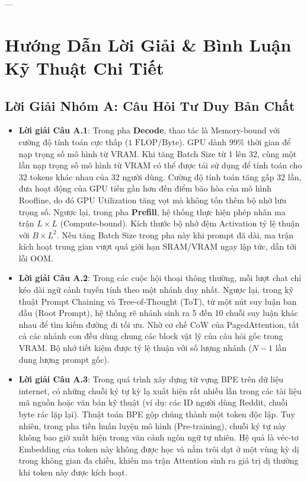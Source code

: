 ---

\section{Hướng Dẫn Lời Giải \& Bình Luận Kỹ Thuật Chi Tiết}
\label{sec:ch07-solutions}

\subsection{Lời Giải Nhóm A: Câu Hỏi Tư Duy Bản Chất}
\begin{itemize}
  \item \textbf{Lời giải Câu A.1}:
  Trong pha \textbf{Decode}, thao tác là Memory-bound với cường độ tính toán cực thấp ($1\text{ FLOP/Byte}$). GPU dành $99\%$ thời gian để nạp trọng số mô hình từ VRAM. Khi tăng Batch Size từ 1 lên 32, cùng một lần nạp trọng số mô hình từ VRAM có thể được tái sử dụng để tính toán cho 32 tokens khác nhau của 32 người dùng. Cường độ tính toán tăng gấp 32 lần, đưa hoạt động của GPU tiến gần hơn đến điểm bão hòa của mô hình Roofline, do đó GPU Utilization tăng vọt mà không tốn thêm bộ nhớ lưu trọng số.
  Ngược lại, trong pha \textbf{Prefill}, hệ thống thực hiện phép nhân ma trận $L \times L$ (Compute-bound). Kích thước bộ nhớ đệm Activation tỷ lệ thuận với $B \times L^2$. Nếu tăng Batch Size trong pha này khi prompt đã dài, ma trận kích hoạt trung gian vượt quá giới hạn SRAM/VRAM ngay lập tức, dẫn tới lỗi OOM.

  \item \textbf{Lời giải Câu A.2}:
  Trong các cuộc hội thoại thông thường, mỗi lượt chat chỉ kéo dài ngữ cảnh tuyến tính theo một nhánh duy nhất. Ngược lại, trong kỹ thuật Prompt Chaining và Tree-of-Thought (ToT), từ một nút suy luận ban đầu (Root Prompt), hệ thống rẽ nhánh sinh ra 5 đến 10 chuỗi suy luận khác nhau để tìm kiếm đường đi tối ưu. Nhờ cơ chế CoW của PagedAttention, tất cả các nhánh con đều dùng chung các block vật lý của câu hỏi gốc trong VRAM. Bộ nhớ tiết kiệm được tỷ lệ thuận với số lượng nhánh ($N-1$ lần dung lượng prompt gốc).

  \item \textbf{Lời giải Câu A.3}:
  Trong quá trình xây dựng từ vựng BPE trên dữ liệu internet, có những chuỗi ký tự kỳ lạ xuất hiện rất nhiều lần trong các tài liệu mã nguồn hoặc văn bản kỹ thuật (ví dụ: các ID người dùng Reddit, chuỗi byte rác lặp lại). Thuật toán BPE gộp chúng thành một token độc lập. Tuy nhiên, trong pha tiền huấn luyện mô hình (Pre-training), chuỗi ký tự này không bao giờ xuất hiện trong văn cảnh ngôn ngữ tự nhiên. Hệ quả là véc-tơ Embedding của token này không được học và nằm trôi dạt ở một vùng kỳ dị trong không gian đa chiều, khiến ma trận Attention sinh ra giá trị dị thường khi token này được kích hoạt.


\end{itemize}
